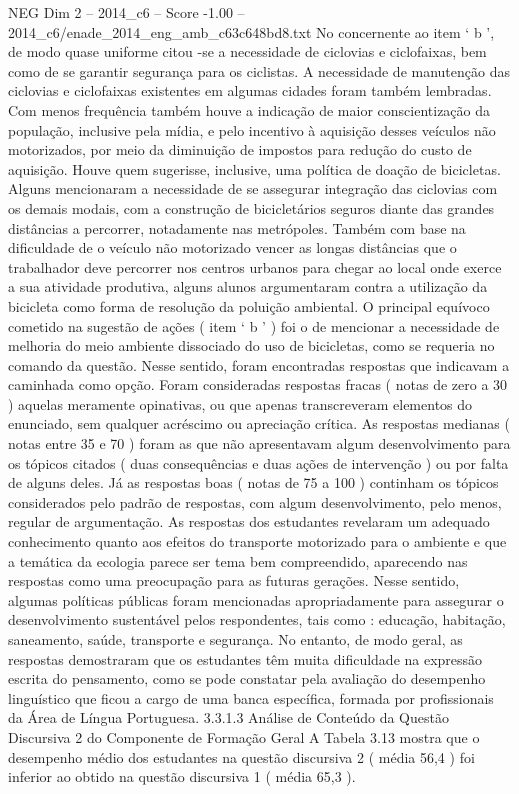 \begin{textsample}{NEG Dim 2 – 2014\_c6 – Score -1.00 – 2014\_c6/enade\_2014\_eng\_amb\_c63c648bd8.txt}
No concernente ao item ‘ b ’, de modo quase uniforme citou -se a necessidade de ciclovias e ciclofaixas, bem como de se garantir segurança para os ciclistas.
A necessidade de manutenção das ciclovias e ciclofaixas existentes em algumas cidades foram também lembradas.
Com menos frequência também houve a indicação de maior conscientização da população, inclusive pela mídia, e pelo incentivo à aquisição desses veículos não motorizados, por meio da diminuição de impostos para redução do custo de aquisição.
Houve quem sugerisse, inclusive, uma política de doação de bicicletas.
Alguns mencionaram a necessidade de se assegurar integração das ciclovias com os demais modais, com a construção de bicicletários seguros diante das grandes distâncias a percorrer, notadamente nas metrópoles.
Também com base na dificuldade de o veículo não motorizado vencer as longas distâncias que o trabalhador deve percorrer nos centros urbanos para chegar ao local onde exerce a sua atividade produtiva, alguns alunos argumentaram contra a utilização da bicicleta como forma de resolução da poluição ambiental.
O principal equívoco cometido na sugestão de ações ( item ‘ b ’ ) foi o de mencionar a necessidade de melhoria do meio ambiente dissociado do uso de bicicletas, como se requeria no comando da questão.
Nesse sentido, foram encontradas respostas que indicavam a caminhada como opção.
Foram consideradas respostas fracas ( notas de zero a 30 ) aquelas meramente opinativas, ou que apenas transcreveram elementos do enunciado, sem qualquer acréscimo ou apreciação crítica.
As respostas medianas ( notas entre 35 e 70 ) foram as que não apresentavam algum desenvolvimento para os tópicos citados ( duas consequências e duas ações de intervenção ) ou por falta de alguns deles.
Já as respostas boas ( notas de 75 a 100 ) continham os tópicos considerados pelo padrão de respostas, com algum desenvolvimento, pelo menos, regular de argumentação.
As respostas dos estudantes revelaram um adequado conhecimento quanto aos efeitos do transporte motorizado para o ambiente e que a temática da ecologia parece ser tema bem compreendido, aparecendo nas respostas como uma preocupação para as futuras gerações.
Nesse sentido, algumas políticas públicas foram mencionadas apropriadamente para assegurar o desenvolvimento sustentável pelos respondentes, tais como : educação, habitação, saneamento, saúde, transporte e segurança.
No entanto, de modo geral, as respostas demostraram que os estudantes têm muita dificuldade na expressão escrita do pensamento, como se pode constatar pela avaliação do desempenho linguístico que ficou a cargo de uma banca específica, formada por profissionais da Área de Língua Portuguesa. 3.3.1.3 Análise de Conteúdo da Questão Discursiva 2 do Componente de Formação Geral A Tabela 3.13 mostra que o desempenho médio dos estudantes na questão discursiva 2 ( média 56,4 ) foi inferior ao obtido na questão discursiva 1 ( média 65,3 ).

\end{textsample}
